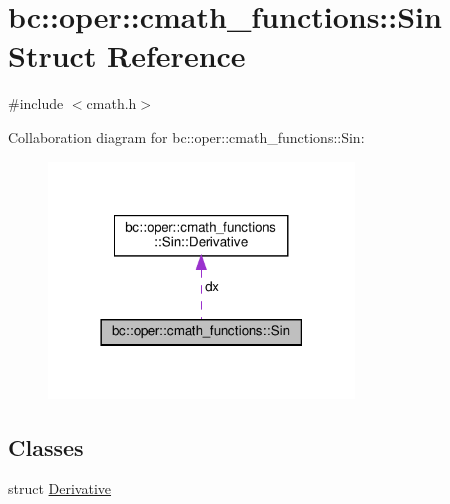 \hypertarget{structbc_1_1oper_1_1cmath__functions_1_1Sin}{}\section{bc\+:\+:oper\+:\+:cmath\+\_\+functions\+:\+:Sin Struct Reference}
\label{structbc_1_1oper_1_1cmath__functions_1_1Sin}


{\ttfamily \#include $<$cmath.\+h$>$}



Collaboration diagram for bc\+:\+:oper\+:\+:cmath\+\_\+functions\+:\+:Sin\+:\nopagebreak
\begin{figure}[H]
\begin{center}
\leavevmode
\includegraphics[width=230pt]{structbc_1_1oper_1_1cmath__functions_1_1Sin__coll__graph}
\end{center}
\end{figure}
\subsection*{Classes}
\begin{DoxyCompactItemize}
\item 
struct \hyperlink{structbc_1_1oper_1_1cmath__functions_1_1Sin_1_1Derivative}{Derivative}
\end{DoxyCompactItemize}

